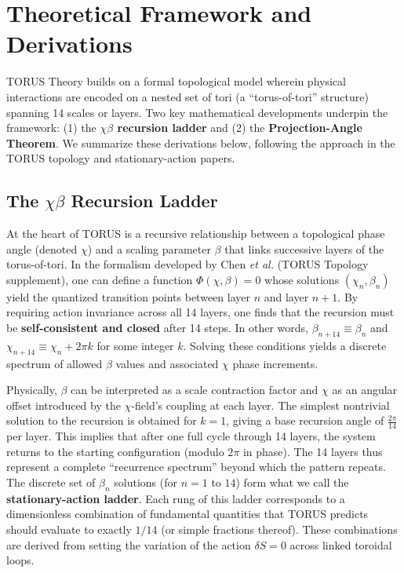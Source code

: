 \documentclass{article}
\begin{document}
\section{Theoretical Framework and Derivations}\label{sec:derivation}
TORUS Theory builds on a formal topological model wherein physical interactions are encoded on a nested set of tori (a ``torus-of-tori'' structure) spanning 14 scales or layers. Two key mathematical developments underpin the framework: (1) the \textbf{$\chi$$\beta$ recursion ladder} and (2) the \textbf{Projection-Angle Theorem}. We summarize these derivations below, following the approach in the TORUS topology and stationary-action papers.

\subsection{The $\chi$$\beta$ Recursion Ladder}
At the heart of TORUS is a recursive relationship between a topological phase angle (denoted $\chi$) and a scaling parameter $\beta$ that links successive layers of the torus-of-tori. In the formalism developed by Chen \emph{et al.} (TORUS Topology supplement), one can define a function $\Phi(\chi,\beta)=0$ whose solutions $(\chi_n,\beta_n)$ yield the quantized transition points between layer $n$ and layer $n+1$. By requiring action invariance across all 14 layers, one finds that the recursion must be \textbf{self-consistent and closed} after 14 steps. In other words, $\beta_{n+14} \equiv \beta_n$ and $\chi_{n+14} \equiv \chi_n + 2\pi k$ for some integer $k$. Solving these conditions yields a discrete spectrum of allowed $\beta$ values and associated $\chi$ phase increments.

Physically, $\beta$ can be interpreted as a scale contraction factor and $\chi$ as an angular offset introduced by the $\chi$-field's coupling at each layer. The simplest nontrivial solution to the recursion is obtained for $k=1$, giving a base recursion angle of $\frac{2\pi}{14}$ per layer. This implies that after one full cycle through 14 layers, the system returns to the starting configuration (modulo $2\pi$ in phase). The 14 layers thus represent a complete ``recurrence spectrum'' beyond which the pattern repeats. The discrete set of $\beta_n$ solutions (for $n=1$ to $14$) form what we call the \textbf{stationary-action ladder}. Each rung of this ladder corresponds to a dimensionless combination of fundamental quantities that TORUS predicts should evaluate to exactly $1/14$ (or simple fractions thereof). These combinations are derived from setting the variation of the action $\delta S=0$ across linked toroidal loops.
\end{document}
